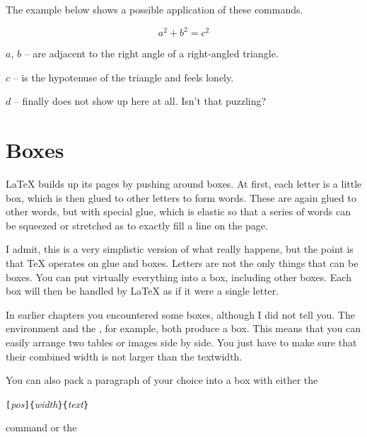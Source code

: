 \noindent The example below shows a possible application of these commands.

\begin{example}
\newenvironment{vardesc}[1]{%
  \settowidth{\parindent}{#1:\ }
  \makebox[0pt][r]{#1:\ }}{}

\begin{displaymath}
a^2+b^2=c^2
\end{displaymath}

\begin{vardesc}{Where}$a$,
$b$ -- are adjacent to the right
angle of a right-angled triangle.

$c$ -- is the hypotenuse of
the triangle and feels lonely.

$d$ -- finally does not show up
here at all. Isn't that puzzling?
\end{vardesc}
\end{example}

\section{Boxes}
\LaTeX{} builds up its pages by pushing around boxes. At first, each
letter is a little box, which is then glued to other letters to form
words. These are again glued to other words, but with special glue,
which is elastic so that a series of words can be squeezed or
stretched as to exactly fill a line on the page.

I admit, this is a very simplistic version of what really happens, but the
point is that \TeX{} operates on glue and boxes. Letters are not the only
things that can be boxes. You can put virtually everything into a box,
including other boxes. Each box will then be handled by \LaTeX{} as if it
were a single letter.

In earlier chapters you encountered some boxes, although I did
not tell you. The  environment and the , for
example, both produce a box. This means that you can easily arrange two
tables or images side by side. You just have to make sure that their
combined width is not larger than the textwidth.

You can also pack a paragraph of your choice into a box with either
the

\begin{lscommand}
\verb|[|\emph{pos}\verb|]{|\emph{width}\verb|}{|\emph{text}\verb|}|
\end{lscommand}

\noindent command or the

